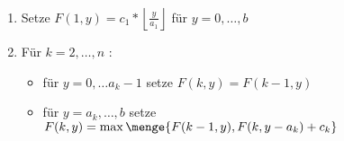 \begin{*algorithmus}
	\begin{enumerate}[label=Schritt \arabic*:, leftmargin=*]
		\item Setze $F(1,y) = c_1 * \left\lfloor \frac{y}{a_1} \right\rfloor$ für $y = 0, \dots, b$
		\item Für $k = 2, \dots, n$ :
		\begin{itemize}
			\item für $y = 0, \dots a_k - 1$ setze $F(k,y) = F(k-1,y)$
			\item für $y = a_k, \dots, b$ setze $F(k,y) = \max\menge{F(k-1,y), F(k,y-a_k)+c_k}$
		\end{itemize}
	\end{enumerate}
\end{*algorithmus}


